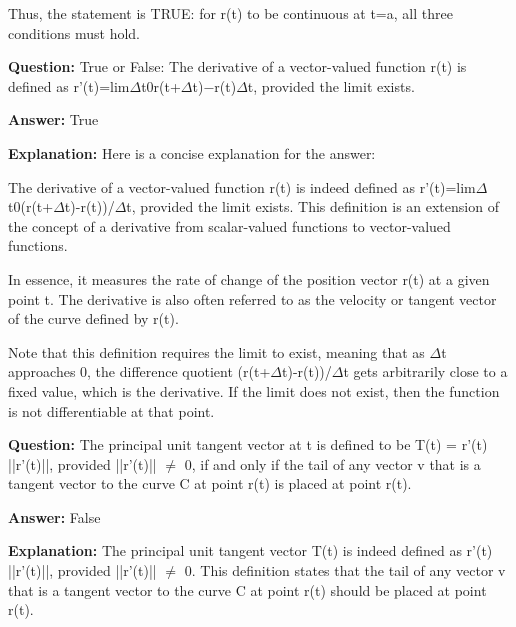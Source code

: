\documentclass{article}
\begin{document}
Thus, the statement is TRUE: for r(t) to be continuous at t=a, all three conditions must hold.
                
                \vspace{0.5cm} 
        
            
                \textbf {Question:} True or False: The derivative of a vector-valued function r(t) is defined as r'(t)=lim\ensuremath{\Delta}t{\textrightarrow}0r(t+\ensuremath{\Delta}t)\ensuremath{-}r(t)\ensuremath{\Delta}t, provided the limit exists.
                
                \textbf{Answer:} True

                \textbf{Explanation:} Here is a concise explanation for the answer:

The derivative of a vector-valued function r(t) is indeed defined as r'(t)=lim\ensuremath{\Delta}t{\textrightarrow}0(r(t+\ensuremath{\Delta}t)-r(t))/\ensuremath{\Delta}t, provided the limit exists. This definition is an extension of the concept of a derivative from scalar-valued functions to vector-valued functions.

In essence, it measures the rate of change of the position vector r(t) at a given point t. The derivative is also often referred to as the velocity or tangent vector of the curve defined by r(t).

Note that this definition requires the limit to exist, meaning that as \ensuremath{\Delta}t approaches 0, the difference quotient (r(t+\ensuremath{\Delta}t)-r(t))/\ensuremath{\Delta}t gets arbitrarily close to a fixed value, which is the derivative. If the limit does not exist, then the function is not differentiable at that point.
                
                \vspace{0.5cm} 
        
            
                \textbf {Question:} The principal unit tangent vector at t is defined to be T(t) = r'(t) ||r'(t)||, provided ||r'(t)|| \ensuremath{\neq} 0, if and only if the tail of any vector v that is a tangent vector to the curve C at point r(t) is placed at point r(t).
                
                \textbf{Answer:} False

                \textbf{Explanation:} The principal unit tangent vector T(t) is indeed defined as r'(t) ||r'(t)||, provided ||r'(t)|| \ensuremath{\neq} 0. This definition states that the tail of any vector v that is a tangent vector to the curve C at point r(t) should be placed at point r(t). 
\end{document}
